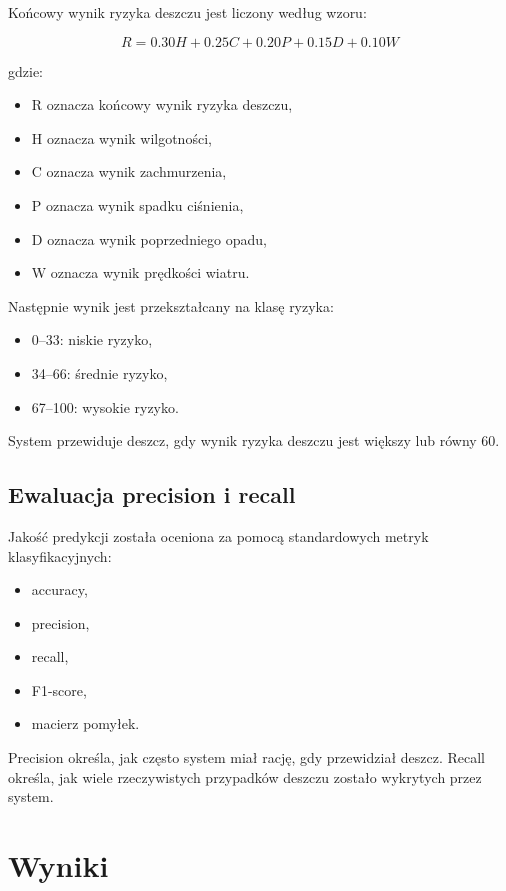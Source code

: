 \documentclass[12pt,a4paper]{article}
\begin{document}
Końcowy wynik ryzyka deszczu jest liczony według wzoru:

\[
R = 0.30H + 0.25C + 0.20P + 0.15D + 0.10W
\]

gdzie:

\begin{itemize}
\item R oznacza końcowy wynik ryzyka deszczu,
\item H oznacza wynik wilgotności,
\item C oznacza wynik zachmurzenia,
\item P oznacza wynik spadku ciśnienia,
\item D oznacza wynik poprzedniego opadu,
\item W oznacza wynik prędkości wiatru.
\end{itemize}

Następnie wynik jest przekształcany na klasę ryzyka:

\begin{itemize}
\item 0--33: niskie ryzyko,
\item 34--66: średnie ryzyko,
\item 67--100: wysokie ryzyko.
\end{itemize}

System przewiduje deszcz, gdy wynik ryzyka deszczu jest większy lub równy 60.

\subsection{Ewaluacja precision i recall}

Jakość predykcji została oceniona za pomocą standardowych metryk klasyfikacyjnych:

\begin{itemize}
\item accuracy,
\item precision,
\item recall,
\item F1-score,
\item macierz pomyłek.
\end{itemize}

Precision określa, jak często system miał rację, gdy przewidział deszcz. Recall określa, jak wiele rzeczywistych przypadków deszczu zostało wykrytych przez system.

\section{Wyniki}
\end{document}
